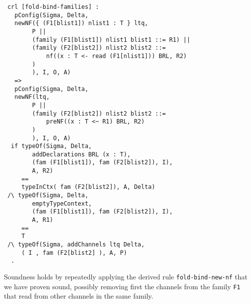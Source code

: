\documentclass{article}
\begin{document}
\begin{itemize}
\begin{lstlisting}
 crl [fold-bind-families] :
   pConfig(Sigma, Delta,
   newNF({ (F1[blist1]) nlist1 : T } ltq, 
        P || 
        (family (F1[blist1]) nlist1 blist1 ::= R1) || 
        (family (F2[blist2]) nlist2 blist2 ::= 
            nf((x : T <- read (F1[nlist1])) BRL, R2)
        )                
        ), I, O, A)
   =>  
   pConfig(Sigma, Delta,    
   newNF(ltq, 
        P ||
        (family (F2[blist2]) nlist2 blist2 ::= 
            preNF((x : T <~ R1) BRL, R2)
        )                
        ), I, O, A)  
  if typeOf(Sigma, Delta, 
        addDeclarations BRL (x : T), 
        (fam (F1[blist1]), fam (F2[blist2]), I), 
        A, R2) 
     == 
     typeInCtx( fam (F2[blist2]), A, Delta)             
 /\ typeOf(Sigma, Delta, 
        emptyTypeContext, 
        (fam (F1[blist1]), fam (F2[blist2]), I), 
        A, R1) 
     ==  
     T
 /\ typeOf(Sigma, addChannels ltq Delta,
     ( I , fam (F2[blist2] ), A, P)       
  .
\end{lstlisting}

Soundness holds by repeatedly applying the derived rule
\texttt{fold-bind-new-nf} that we have proven sound, possibly 
removing first the channels from the family \texttt{F1} that read
from other channels in the same family.


\end{itemize}
\end{document}
